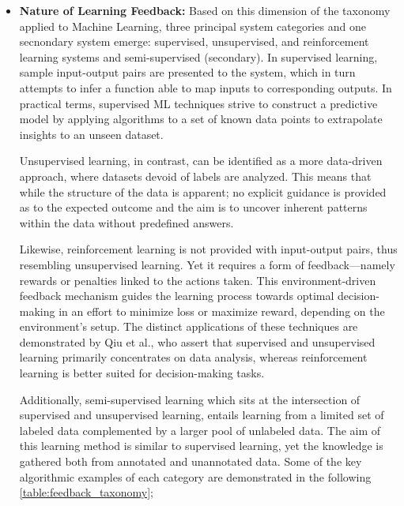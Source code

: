 \begin{itemize}
    \item \textbf{Nature of Learning Feedback:} Based on this dimension of the taxonomy applied to Machine Learning, three principal system categories and one secnondary system
          emerge: supervised, unsupervised, and reinforcement learning systems and semi-supervised (secondary). In supervised learning, sample input-output pairs are presented to the
          system, which in turn attempts to infer a function able to map inputs to corresponding outputs. In practical terms, supervised ML techniques strive
          to construct a predictive model by applying algorithms to a set of known data points to extrapolate insights to an unseen dataset\cite{sarker_ml_algorithms_2021,hastie_statistical_learning_2017}.

          Unsupervised learning, in contrast, can be identified as a more data-driven approach, where datasets devoid of labels are analyzed. This means that while
          the structure of the data is apparent; no explicit guidance is provided as to the expected outcome and the aim is to uncover inherent patterns within
          the data without predefined answers.

          Likewise, reinforcement learning is not provided with input-output pairs, thus resembling unsupervised learning.
          Yet it requires a form of feedback—namely rewards or penalties linked to the actions taken. This environment-driven feedback mechanism guides the
          learning process towards optimal decision-making in an effort to minimize loss or maximize reward, depending on the environment's setup\cite{spyropoulos_lectures_2023}.
          The distinct applications of these techniques are demonstrated by Qiu et al.\cite{survey_ml_big_data_2016}, who assert that supervised and unsupervised
          learning primarily concentrates on data analysis, whereas reinforcement learning is better suited for decision-making tasks.

          Additionally, semi-supervised learning which sits at the intersection of supervised and unsupervised learning, entails learning from a limited set of
          labeled data complemented by a larger pool of unlabeled data. The aim of this learning method is similar to supervised learning, yet the
          knowledge is gathered both from annotated and unannotated data. Some of the key algorithmic examples of each category are demonstrated in the following \cref{table:feedback_taxonomy};


\end{itemize}
